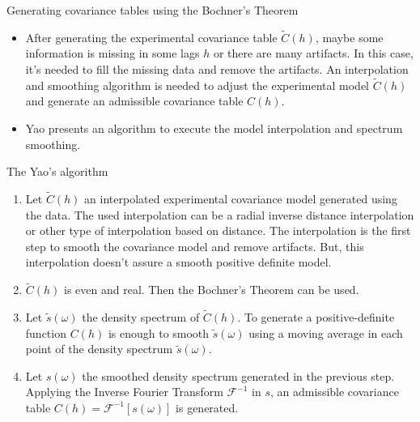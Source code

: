 \begin{frame}{Generating covariance tables using the Bochner's Theorem}

\begin{itemize}
\item After generating the experimental covariance table $\tilde{C}(h)$, maybe some information is missing in some lags $h$ or there are many artifacts. In this case, it's needed to fill the missing data and remove the artifacts. An interpolation and smoothing algorithm is needed to adjust the experimental model $\tilde{C}(h)$ and generate an admissible covariance table $C(h)$. 

\item Yao \cite{cov.paper} presents an algorithm to execute the model interpolation and spectrum smoothing.
\end{itemize}

\end{frame}


\begin{frame}{The Yao's algorithm}

\begin{enumerate}
\item Let $\tilde{C}(h)$ an interpolated experimental covariance model generated using the data. The used interpolation can be a radial inverse distance interpolation or other type of interpolation based on distance. The interpolation is the first step to smooth the covariance model and remove artifacts. But, this interpolation doesn't assure a smooth positive definite model.
\item $\tilde{C}(h)$ is even and real. Then the Bochner's Theorem can be used.
\item Let $\tilde{s}(\omega)$ the density spectrum of $\tilde{C}(h)$. To generate a positive-definite function $C(h)$ is enough to smooth $\tilde{s}(\omega)$ using a moving average in each point of the density spectrum $\tilde{s}(\omega)$. 
\item Let $s(\omega)$ the smoothed density spectrum generated in the previous step. Applying the Inverse Fourier Transform $\mathscr{F}^{-1}$ in $s$, an admissible covariance table $C(h) = \mathscr{F}^{-1}[s(\omega)]$ is generated.
\end{enumerate}

\end{frame}

